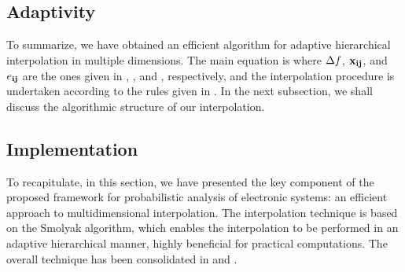 \subsection{Adaptivity} 


To summarize, we have obtained an efficient algorithm for adaptive hierarchical
interpolation in multiple dimensions. The main equation is 
where $\Delta f$, $\mathbf{x}_{\mathbf{i}\mathbf{j}}$, and $e_{\mathbf{i}\mathbf{j}}$ are the ones given in
, , and , respectively, and the
interpolation procedure is undertaken according to the rules given in
. In the next subsection, we shall discuss the algorithmic
structure of our interpolation.

\subsection{Implementation} 


To recapitulate, in this section, we have presented the key component of the
proposed framework for probabilistic analysis of electronic systems: an
efficient approach to multidimensional interpolation. The interpolation
technique is based on the Smolyak algorithm, which enables the interpolation to
be performed in an adaptive hierarchical manner, highly beneficial for practical
computations. The overall technique has been consolidated in 
and .
